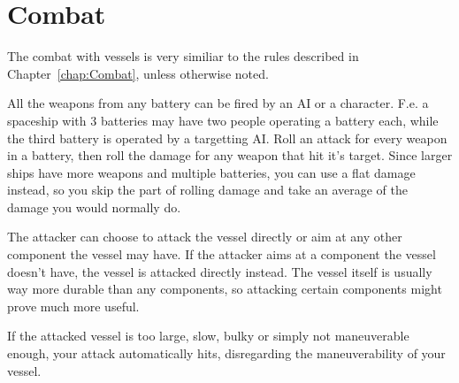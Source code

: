 \section{Combat}
\label{sec:Vessels-Combat}

The combat with vessels is very similiar to the rules described in Chapter~\ref{chap:Combat}, unless otherwise noted.

All the weapons from any battery can be fired by an AI or a character. F.e. a spaceship with 3 batteries may have two people operating a battery each, while the third battery is operated by a targetting AI. Roll an attack for every weapon in a battery, then roll the damage for any weapon that hit it's target. Since larger ships have more weapons and multiple batteries, you can use a flat damage instead, so you skip the part of rolling damage and take an average of the damage you would normally do.

The attacker can choose to attack the vessel directly or aim at any other component the vessel may have. If the attacker aims at a component the vessel doesn't have, the vessel is attacked directly instead. The vessel itself is usually way more durable than any components, so attacking certain components might prove much more useful.

If the attacked vessel is too large, slow, bulky or simply not maneuverable enough, your attack automatically hits, disregarding the maneuverability of your vessel.
